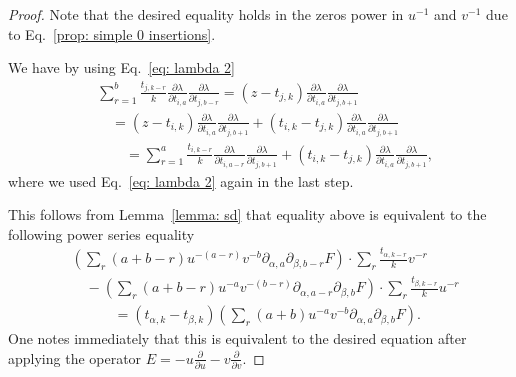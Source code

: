 \documentclass[12pt,a4paper]{amsart}
\newcommand{\p}{{\partial}}
\newcommand{\<}{\left<}
\renewcommand{\>}{\right>}
\numberwithin{equation}{section}
\begin{document}
\begin{proof}
Note that the desired equality holds in the zeros power in $u^{-1}$ and $v^{-1}$ due to Eq.~\ref{prop: simple 0 insertions}.

We have by using Eq.~\eqref{eq: lambda 2}
\begin{align}
    & \sum_{r=1}^b \frac{t_{j,k-r}}{k} \frac{\p \lambda}{\p t_{i,a}} \frac{\p \lambda}{\p t_{j,b-r}} 
    = (z - t_{j,k}) \frac{\p \lambda}{\p t_{i,a}}\frac{\p \lambda}{\p t_{j,b+1}} 
    \\
    &\quad = (z - t_{i,k}) \frac{\p \lambda}{\p t_{i,a}}\frac{\p \lambda}{\p t_{j,b+1}} 
    + (t_{i,k} - t_{j,k}) \frac{\p \lambda}{\p t_{i,a}}\frac{\p \lambda}{\p t_{j,b+1}} 
    \\
    &\qquad = \sum_{r=1}^a \frac{t_{i,k-r}}{k} \frac{\p \lambda}{\p t_{i,a-r}}\frac{\p \lambda}{\p t_{j,b+1}} 
    + (t_{i,k} - t_{j,k}) \frac{\p \lambda}{\p t_{i,a}}\frac{\p \lambda}{\p t_{j,b+1}},
\end{align}
where we used Eq.~\eqref{eq: lambda 2} again in the last step.

This follows from Lemma~\ref{lemma: sd} that equality above is equivalent to the following power series equality
\begin{align*}
     & \left(\sum_r (a+b-r) u^{-(a-r)}v^{-b} \p_{\alpha,a}\p_{\beta,b-r}F\right) \cdot \sum_r \frac{t_{\alpha,k-r}}{k} v^{-r} 
     \\
     & \quad - \left(\sum_r (a+b-r) u^{-a}v^{-(b-r)} \p_{\alpha,a-r}\p_{\beta,b}F\right) \cdot \sum_r \frac{t_{\beta,k-r}}{k} u^{-r} 
     \\
     & \quad\qquad = (t_{\alpha,k} - t_{\beta,k}) \left(\sum_r (a+b) u^{-a}v^{-b} \p_{\alpha,a}\p_{\beta,b}F\right).
\end{align*}
One notes immediately that this is equivalent to the desired equation after applying the operator $E = -u \frac{\p}{\p u} - v \frac{\p}{\p v}$.

\end{proof}
\end{document}
